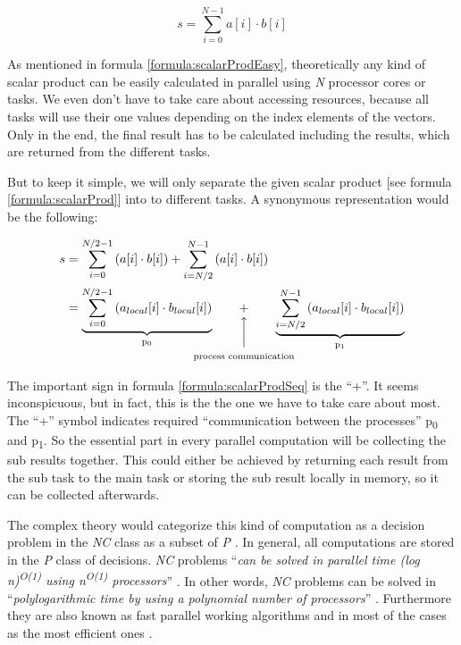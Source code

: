 \begin{equation} \label{formula:scalarProd}
	s = \sum_{i=0}^{N - 1} a[i] \cdot b[i]
\end{equation}

\newpage

As mentioned in formula \ref{formula:scalarProdEasy}, theoretically any kind of scalar product can be easily calculated in parallel using \textit{N} processor cores or tasks. We even don't have to take care about accessing resources, because all tasks will use their one values depending on the index elements of the vectors. Only in the end, the final result has to be calculated including the results, which are returned from the different tasks.

But to keep it simple, we will only separate the given scalar product [see formula \ref{formula:scalarProd}] into to different tasks. A synonymous representation would be the following:

\begin{align} \label{formula:scalarProdSeq}
	\begin{aligned}
		s &= \sum_{i = 0}^{N / 2 - 1} \left(a[i] \cdot b[i]\right) + \sum_{i = N / 2}^{N - 1} \left(a[i] \cdot b[i]\right)
		\\ &=  \underbrace{\sum_{i = 0}^{N / 2 - 1} \left(a_{local}[i] \cdot b_{local}[i]\right)}_\text{p\textsubscript{0}} \qquad \vertarrowbox{+}{process communication} \qquad \underbrace{\sum_{i = N / 2}^{N - 1} \left(a_{local}[i] \cdot b_{local}[i]\right)}_\text{p\textsubscript{1}}
	\end{aligned}
\end{align}

The important sign in formula \ref{formula:scalarProdSeq} is the ``+''. It seems inconspicuous, but in fact, this is the the one we have to take care about most. The ``+'' symbol indicates required ``communication between the processes'' \parencite[see][p]{internet2} p\textsubscript{0} and p\textsubscript{1}. So the essential part in every parallel computation will be collecting the sub results together. This could either be achieved by returning each result from the sub task to the main task or storing the sub result locally in memory, so it can be collected afterwards.

The complex theory would categorize this kind of computation as a decision problem in the \textit{NC} class as a subset of \textit{P} \parencite{book8}. In general, all computations are stored in the \textit{P} class of decisions. \textit{NC} problems ``\textit{can be solved in parallel time (log n)\textsuperscript{O(1)} using n\textsuperscript{O(1)} processors}'' \parencite[see][Chapter 10, p91]{inbook1}. In other words, \textit{NC} problems can be solved in ``\textit{polylogarithmic time by using a polynomial number of processors}'' \parencite[see][Chapter 10, p91]{inbook1}. Furthermore they are also known as fast parallel working algorithms \parencite{inbook1} and in most of the cases as the most efficient ones \parencite{book8}.\\

